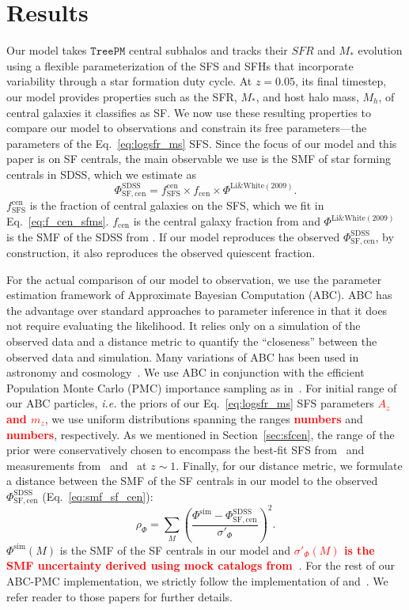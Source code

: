 \documentclass[12pt, letterpaper, preprint, tighten]{aastex}
\newcommand{\todo}[1]{{\bf \textcolor{red}{#1}}}
\newcommand{\beq}{\begin{equation}}
\newcommand{\eeq}{\end{equation}}
\begin{document}
\section{Results}
Our model takes $\mathtt{TreePM}$ central subhalos and tracks their $SFR$ 
and $M_*$ evolution using a flexible parameterization of the SFS and 
SFHs that incorporate variability through a star formation duty cycle.
At $z = 0.05$, its final timestep, our model provides properties such 
as the SFR, $M_*$, and host halo mass, $M_h$, of central galaxies it 
classifies as SF. We now use these resulting properties to compare our 
model to observations and constrain its free parameters---the parameters 
of the Eq.~\ref{eq:logsfr_ms} SFS. Since the focus of our model and this 
paper is on SF centrals, the main observable we use is the SMF of star 
forming centrals in SDSS, which we estimate as 
\beq \label{eq:smf_sf_cen} 
\Phi^\mathrm{SDSS}_\mathrm{SF,cen} = f^\mathrm{cen}_\mathrm{SFS} \times f_\mathrm{cen} \times \Phi^\mathrm{Li\&White(2009)}.
\eeq
$f^\mathrm{cen}_\mathrm{SFS}$ is the fraction of central galaxies on the 
SFS, which we fit in Eq.~\ref{eq:f_cen_sfms}. $f_\mathrm{cen}$ is the 
central galaxy fraction from \cite{wetzel2013} and $\Phi^\mathrm{Li\&White(2009)}$ 
is the SMF of the SDSS from \cite{li2009}. If our model reproduces the 
observed $\Phi^\mathrm{SDSS}_\mathrm{SF,cen}$, by construction, it also 
reproduces the observed quiescent fraction. 

For the actual comparison of our model to observation, we use the parameter 
estimation framework of Approximate Bayesian Computation (ABC). ABC has the 
advantage over standard approaches to parameter inference in that it does not 
require evaluating the likelihood. It relies only on a simulation of the observed 
data and a distance metric to quantify the ``closeness'' between the observed data
and simulation. Many variations of ABC has been used in astronomy and 
cosmology~\citep[\emph{e.g.}][]{cameron2012,weyant2013,ishida2015,alsing2018}. 
We use ABC in conjunction with the efficient Population Monte Carlo (PMC)
importance sampling as in~\citep{hahn2016, hahn2017}. For initial range of our
ABC particles, \emph{i.e.} the priors of our Eq.~\ref{eq:logsfr_ms} SFS parameters
\todo{$A_z$ and $m_z$}, we use uniform distributions spanning the ranges 
\todo{numbers} and \todo{numbers}, respectively. As we mentioned in Section~\ref{sec:sfcen}, 
the range of the prior were conservatively chosen to encompass the best-fit SFS from~\cite{speagle2014} 
and measurements from~\cite{moustakas2013} and~\cite{lee2015} at $z \sim 1$. 
Finally, for our distance metric, we formulate a distance between the SMF of
the SF centrals in our model to the observed $\Phi^\mathrm{SDSS}_\mathrm{SF,cen}$ 
(Eq.~\ref{eq:smf_sf_cen}): 
\beq
\rho_\Phi = \sum\limits_{M} \left( \frac{\Phi^\mathrm{sim} - \Phi^\mathrm{SDSS}_\mathrm{SF,cen}}{\sigma'_\Phi}\right)^2.
\eeq
$\Phi^\mathrm{sim}(M)$ is the SMF of the SF centrals in our model and 
\todo{$\sigma'_\Phi(M)$ is the SMF uncertainty derived using mock catalogs from~\cite{li2009}}. 
For the rest of our ABC-PMC implementation, we strictly follow the implementation 
of \cite{hahn2017b} and~\cite{hahn2017a}. We refer reader to those papers for 
further details.
\end{document}
